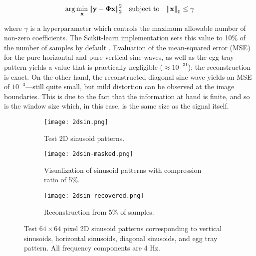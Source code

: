 \begin{equation}\label{eq:omp}
	\arg\min_{\text{\bfseries x}} \norm{\text{\bfseries y} - \bm\Phi \text{\bfseries x}}_2^2 \quad \textrm{subject to} \quad \norm{\text{\bfseries x}}_0 \leq \gamma
\end{equation}

\noindent where $\gamma$ is a hyperparameter which controls the maximum allowable number of non-zero coefficients. The Scikit-learn implementation sets this value to 10\% of the number of samples by default \cite{scikit-learn}. Evaluation of the mean-squared error (MSE) for the pure horizontal and pure vertical sine waves, as well as the egg tray pattern yields a value that is practically negligible ($\approx 10^{-31}$); the reconstruction is exact. On the other hand, the reconstructed diagonal sine wave yields an MSE of $10^{-3}$---still quite small, but mild distortion can be observed at the image boundaries. This is due to the fact that the information at hand is finite, and so is the window size which, in this case, is the same size as the signal itself.

\begin{figure}[tb]
	\centering
	\begin{subfigure}{\textwidth}
		\centering
		\texttt{[image: 2dsin.png]}
		\caption{Test 2D sinusoid patterns.}
		\label{fig:2dsin}
	\end{subfigure}
	\begin{subfigure}{\textwidth}
		\centering
		\texttt{[image: 2dsin-masked.png]}
		\caption{Visualization of sinusoid patterns with compression ratio of 5\%.}
		\label{fig:2dsin-masked}
	\end{subfigure}
	\begin{subfigure}{\textwidth}
		\centering
		\texttt{[image: 2dsin-recovered.png]}
		\caption{Reconstruction from 5\% of samples.}
		\label{fig:2dsin-recovered}
	\end{subfigure}
	\caption{Test $64 \times 64$ pixel 2D sinusoid patterns corresponding to vertical sinusoids, horizontal sinusoids, diagonal sinusoids, and egg tray pattern. All frequency components are 4 Hz.}
	\label{fig:test-2dsin}
\end{figure}


